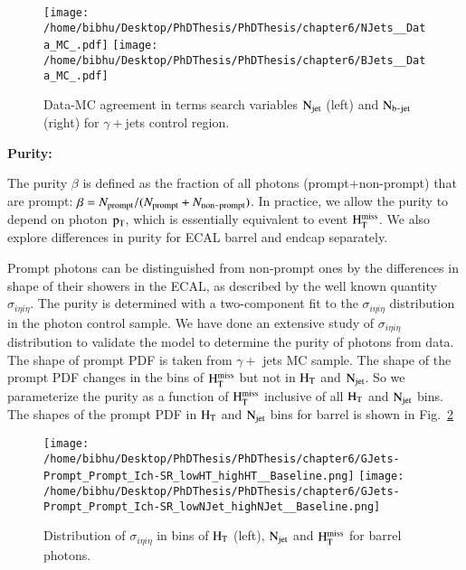 \begin{figure}[h]
\begin{center}
\texttt{[image: /home/bibhu/Desktop/PhDThesis/PhDThesis/chapter6/NJets\_\_Data\_MC\_.pdf]} %
\texttt{[image: /home/bibhu/Desktop/PhDThesis/PhDThesis/chapter6/BJets\_\_Data\_MC\_.pdf]} %
\caption{Data-MC agreement in terms search variables $\rm N_{jet}$ (left) and $\rm N_{b\texttt{-}jet}$ (right) for $\gamma+$jets control region.}
\label{fig:nobs_searchVarsNjBj}
\end{center}
\end{figure}


\newpage

{\bf Purity:}


The purity $\beta$ is defined as the fraction of all photons (prompt+non-prompt) that are prompt: 
$\beta = N_{\rm prompt} / (N_{\rm prompt}+N_{\rm non\texttt{-}prompt})$.  In practice, we allow the purity 
to depend on photon $\rm p_{T}$, which is essentially equivalent to event $\rm H_{T}^{miss}$.  We also explore 
differences in purity for ECAL barrel and endcap separately.


Prompt photons can be distinguished from non-prompt ones by the differences in shape of their 
showers in the ECAL, as described by the well known quantity $\sigma_{i\eta i\eta}$. The purity is determined with a two-component fit to the $\sigma_{i\eta i\eta}$ distribution in the photon control sample.  We have done an extensive study of $\sigma_{i\eta i\eta}$ distribution to validate the model to determine the purity of photons from data. The shape of prompt PDF is taken from $\gamma +$ jets MC sample. The shape of the prompt PDF changes in the bins of $\rm H_{T}^{miss}$ but not in $\rm H_{T}$ and $\rm N_{jet}$. So we parameterize the purity as a function of $\rm H_{T}^{miss}$ inclusive of all $\rm H_{T}$ and $\rm N_{jet}$ bins. The shapes of the prompt PDF  in $\rm H_{T}$ and $\rm N_{jet}$ bins for barrel is shown in Fig.~\ref{fig:PromptShapeBarrel} 

\begin{figure}[h]
\begin{center}
\texttt{[image: /home/bibhu/Desktop/PhDThesis/PhDThesis/chapter6/GJets-Prompt\_Prompt\_Ich-SR\_lowHT\_highHT\_\_Baseline.png]} 
\texttt{[image: /home/bibhu/Desktop/PhDThesis/PhDThesis/chapter6/GJets-Prompt\_Prompt\_Ich-SR\_lowNJet\_highNJet\_\_Baseline.png]} 
\caption{Distribution of $\sigma_{i\eta i\eta}$ in bins of $\rm H_{T}$ (left), $\rm N_{jet}$ and $\rm H_{T}^{miss}$ for barrel photons. }
\label{fig:PromptShapeBarrel}
\end{center}
\end{figure}



